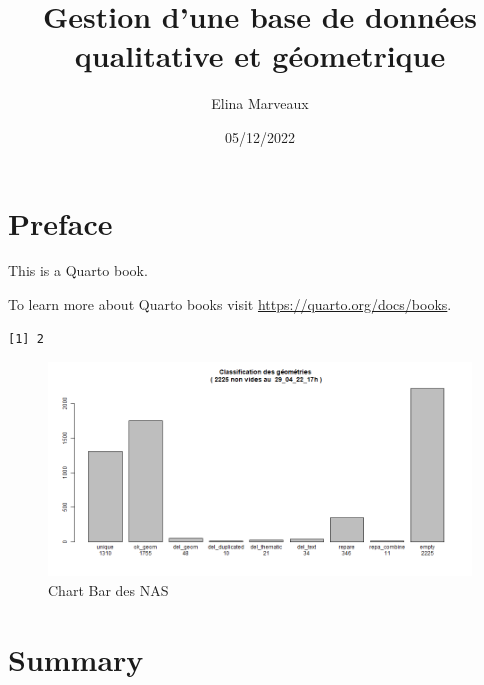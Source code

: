 \documentclass[
  a4paper,
]{scrbook}
\title{Gestion d'une base de données qualitative et géometrique}
\author{Elina Marveaux}
\date{05/12/2022}
\renewcommand*\contentsname{Table of contents}
\newcommand\contentsname{Table of contents}
\begin{document}
\frontmatter
\maketitle
\ifdefined\Shaded\renewenvironment{Shaded}{\begin{tcolorbox}[boxrule=0pt, borderline west={3pt}{0pt}{shadecolor}, enhanced, breakable, frame hidden, sharp corners, interior hidden]}{\end{tcolorbox}}\fi

\renewcommand*\contentsname{Table des matières}
{
\setcounter{tocdepth}{2}
\tableofcontents
}
\listoffigures
\listoftables
\mainmatter
\hypertarget{preface}{%
\chapter*{Preface}\label{preface}}

This is a Quarto book.

To learn more about Quarto books visit
\url{https://quarto.org/docs/books}.

\begin{verbatim}
[1] 2
\end{verbatim}

\begin{figure}

{\centering \includegraphics{./figures/bar_classify_Del_29_04_22_17h.png}

}

\caption{Chart Bar des NAS}

\end{figure}

\hypertarget{summary}{%
\chapter{Summary}\label{summary}}
\end{document}
